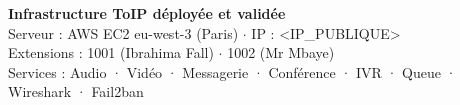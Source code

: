 \documentclass[a4paper,11pt]{report}
\begin{document}
\vspace{1cm}
\begin{tcolorbox}[
  enhanced, arc=8pt,
  colback=primarylight, colframe=primary,
  left=12pt, right=12pt, top=10pt, bottom=10pt
]
\centering
{\color{primary}\large\bfseries Infrastructure ToIP déployée et validée}\\[6pt]
{\color{darkblue}\small
Serveur : AWS EC2 eu-west-3 (Paris) $\cdot$ IP : <IP_PUBLIQUE>\\
Extensions : 1001 (Ibrahima Fall) $\cdot$ 1002 (Mr Mbaye)\\
Services : Audio · Vidéo · Messagerie · Conférence · IVR · Queue · Wireshark · Fail2ban
}
\end{tcolorbox}
\end{document}
